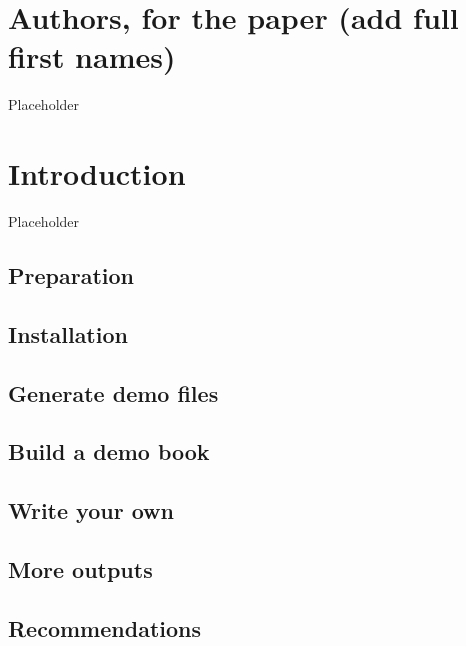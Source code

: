 \documentclass[atmosphere,article,submit,moreauthors,pdftex,10pt,a4paper]{style/mdpi}
\begin{document}
\hypertarget{authors-for-the-paper-add-full-first-names}{%
\section{Authors, for the paper (add full first names)}\label{authors-for-the-paper-add-full-first-names}}

Placeholder

\hypertarget{introduction}{%
\section{Introduction}\label{introduction}}

Placeholder

\hypertarget{preparation}{%
\subsection{Preparation}\label{preparation}}

\hypertarget{installation}{%
\subsection{Installation}\label{installation}}

\hypertarget{generate-demo-files}{%
\subsection{Generate demo files}\label{generate-demo-files}}

\hypertarget{build-a-demo-book}{%
\subsection{Build a demo book}\label{build-a-demo-book}}

\hypertarget{write-your-own}{%
\subsection{Write your own}\label{write-your-own}}

\hypertarget{more-outputs}{%
\subsection{More outputs}\label{more-outputs}}

\hypertarget{recommendations}{%
\subsection{Recommendations}\label{recommendations}}
\end{document}
